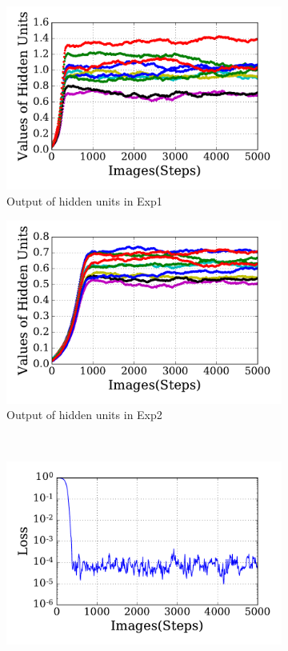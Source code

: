 \begin{figure}
\begin{subfigure}[t]{0.4\textwidth}
		\includegraphics[width=\textwidth]{pics_sdlm/30_exp_RBM/exp1_hid_non.pdf}
		\caption{Output of hidden units in Exp1}
	\end{subfigure}
	\begin{subfigure}[t]{0.4\textwidth}
		\includegraphics[width=\textwidth]{pics_sdlm/30_exp_RBM/exp2_hid_non.pdf}
		\caption{Output of hidden units in Exp2}
	\end{subfigure}\\
	\begin{subfigure}[t]{0.4\textwidth}
		\includegraphics[width=\textwidth]{pics_sdlm/30_exp_RBM/exp1_loss.pdf}

\end{subfigure}
\end{figure}
